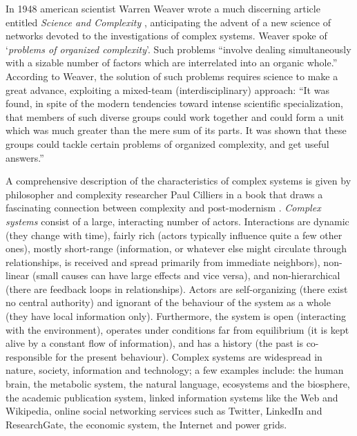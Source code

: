 \documentclass{article}
\begin{document}
In 1948 american scientist Warren Weaver wrote a much discerning article entitled \textit{Science and Complexity} \cite{W48}, anticipating the advent of a new science of networks devoted to the investigations of complex systems. Weaver spoke of `\textit{problems of organized complexity}'. Such problems ``involve dealing simultaneously with a sizable number of factors which are interrelated into an organic whole.'' According to Weaver, the solution of such problems requires science to make a great advance, exploiting a mixed-team (interdisciplinary) approach: ``It was found, in spite of the modern tendencies toward intense scientific specialization, that members of such diverse groups could work together and could form a unit which was much greater than the mere sum of its parts. It was shown that these groups could tackle certain problems of organized complexity, and get useful answers.''

A comprehensive description of the characteristics of complex systems is given by philosopher and complexity researcher Paul Cilliers in a book that draws a fascinating connection between complexity and post-modernism \cite{C98}. \textit{Complex systems} consist of a large, interacting number of actors. Interactions are dynamic (they change with time), fairly rich (actors typically influence quite a few other ones), mostly short-range (information, or whatever else might circulate through relationships, is received and spread primarily from immediate neighbors), non-linear (small causes can have large effects and vice versa), and non-hierarchical (there are feedback loops in relationships). Actors are self-organizing (there exist no central authority) and ignorant of the behaviour of the system as a whole (they have local information only). Furthermore, the system is open (interacting with the environment), operates under conditions far from equilibrium (it is kept alive by a constant flow of information), and has a history (the past is co-responsible for the present behaviour). Complex systems are widespread in nature, society, information and technology; a few examples include: the human brain, the metabolic system, the natural language, ecosystems and the biosphere, the academic publication system, linked information systems like the Web and Wikipedia, online social networking services such as Twitter, LinkedIn and ResearchGate, the economic system, the Internet and power grids. 
\end{document}
